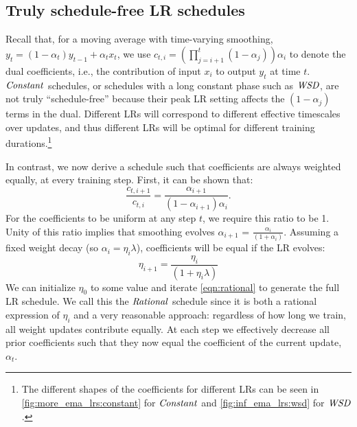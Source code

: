 \subsection{Truly schedule-free LR schedules}\label{subsec:rational}

Recall that, for a moving average with time-varying smoothing,
$y_t = (1 - \alpha_t)y_{t-1} + \alpha_t x_t$,
we use
$c_{t,i} = \left( \prod_{j=i+1}^{t} (1 - \alpha_j) \right) \alpha_i$
to denote the dual coefficients,
i.e., the contribution of input $x_i$ to output $y_t$ at time $t$.
%
$\mbox{\emph{Constant}}$ schedules, or schedules with a long constant phase such as
$\mbox{\emph{WSD}}$, are not truly ``schedule-free'' because their peak LR setting
affects the $(1 - \alpha_j)$ terms in the dual.  Different LRs will
correspond to different effective timescales over updates, and thus
different LRs will be optimal for different training
durations.\footnote{The different shapes of the coefficients for
different LRs can be seen in \cref{fig:more_ema_lrs:constant} for
$\mbox{\emph{Constant}}$ and \cref{fig:inf_ema_lrs:wsd} for $\mbox{\emph{WSD}}$.}

In contrast, we now derive a schedule such that coefficients are
always weighted equally, at every training step.  First, it can be
shown that:
\begin{equation}
    \frac{c_{t,i+1}}{c_{t,i}} = \frac{\alpha_{i+1}}{(1-\alpha_{i+1})\alpha_i}.
\end{equation}
%
For the coefficients to be uniform at any step $t$, we require this
ratio to be 1.  Unity of this ratio implies that smoothing evolves
$\alpha_{i+1}$ = $\frac{\alpha_i}{(1+\alpha_i)}$.  Assuming a fixed
weight decay (so $\alpha_i = \eta_i\lambda$), coefficients will be
equal if the LR evolves:
\begin{equation}\label{eqn:rational}
  \eta_{i+1} = \frac{\eta_i}{(1+\eta_i\lambda)}
\end{equation}
We can initialize $\eta_0$ to some value and iterate
\cref{eqn:rational} to generate the full LR schedule.  We call this
the $\mbox{\emph{Rational}}$ schedule since it is both a rational expression of
$\eta_i$ and a very reasonable approach: regardless of how long we
train, all weight updates contribute equally.  At each step we
effectively decrease all prior coefficients such that they now equal
the coefficient of the current update, $\alpha_t$.
%


